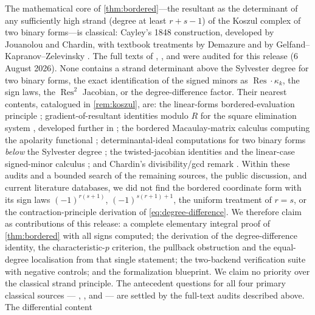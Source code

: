 \documentclass[11pt,reqno]{amsart}
\theoremstyle{definition}
\theoremstyle{remark}
\newcommand{\Res}{\operatorname{Res}}
\begin{document}
The mathematical core of \cref{thm:bordered}---the resultant as the
determinant of any sufficiently high strand (degree at least
$r+s-1$) of the Koszul complex of two binary forms---is classical: Cayley's 1848 construction, developed by
Jouanolou and Chardin, with textbook treatments by Demazure and by
Gelfand--Kapranov--Zelevinsky
\cite{Cayley1848,Jouanolou1991,Chardin1992,Demazure2012,GKZ}.  The
full texts of \cite{Jouanolou1991}, \cite{JouanolouAspects},
\cite{JouanolouFormulaire} and \cite{Chardin1992} were audited for
this release (6 August 2026).  None contains a strand determinant above the
Sylvester degree for two binary forms, the exact identification of
the signed minors as $\Res\cdot\kappa_k$, the sign laws, the
$\Res^2$ Jacobian, or the degree-difference factor.  Their nearest
contents, catalogued in \cref{rem:koszul}, are: the linear-forms
bordered-evaluation principle \cite[5.4.1--5.4.4]{Jouanolou1991};
gradient-of-resultant identities modulo $R$ for the square
elimination system \cite[4.6.3, 6.4.2--6.4.3]{Jouanolou1991},
developed further in \cite[3.10.15, 3.10.31]{JouanolouFormulaire};
the bordered Macaulay-matrix calculus computing the apolarity
functional \cite[3.10.25--3.10.30,
3.11.19.23--3.11.19.31]{JouanolouFormulaire}; determinantal-ideal
computations for two binary forms \emph{below} the Sylvester degree
\cite[3.11.18.18--3.11.18.35]{JouanolouFormulaire}; the
twisted-jacobian identities and the linear-case signed-minor
calculus \cite[3.5.5, 3.8.1.9, 3.8.2.9]{JouanolouAspects}; and
Chardin's divisibility/gcd remark
\cite[\S IV, Remark~1]{Chardin1992}.
Within these audits and a bounded search of the remaining sources,
the public discussion, and current literature databases, we did not
find the bordered coordinate form with its sign laws
$(-1)^{r(s+1)}$, $(-1)^{s(r+1)+1}$, the uniform treatment of
$r=s$, or the contraction-principle derivation of
\eqref{eq:degree-difference}.  We therefore claim as contributions of
this release: a complete elementary integral proof of
\cref{thm:bordered} with all signs computed; the derivation of the
degree-difference identity, the characteristic-$p$ criterion, the
pullback obstruction and the equal-degree localisation from that
single statement; the two-backend verification suite with
negative controls; and the formalization blueprint.  We claim no
priority over the classical strand principle.  The antecedent
questions for all four primary classical sources ---
\cite{Jouanolou1991}, \cite{JouanolouAspects},
\cite{JouanolouFormulaire} and \cite{Chardin1992} --- are settled
by the full-text audits described above.  The differential content
\end{document}
